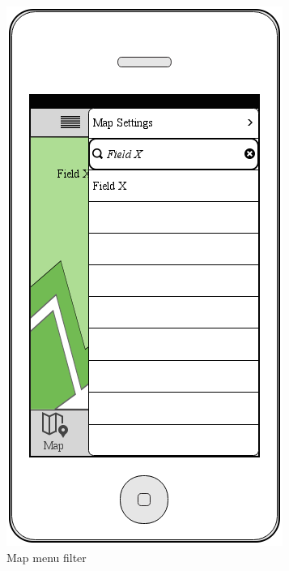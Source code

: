 \documentclass[12pt]{article}
\begin{document}
\begin{figure}[ht]
	\includegraphics[width=\linewidth, height=0.4\textheight, keepaspectratio=true]{mockups/MapMenuFilter.png}
	\caption{Map menu filter}
	\endminipage\hfill
	\centering

\end{figure}
\end{document}
